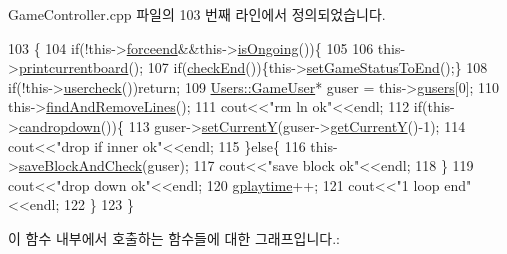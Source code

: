 Game\+Controller.\+cpp 파일의 103 번째 라인에서 정의되었습니다.


\begin{DoxyCode}
103                                       \{
104             \textcolor{keywordflow}{if}(!this->\hyperlink{class_tetris_1_1_game_controller_a015411333b232483387d89f3ba0617e0}{forceend}&&this->\hyperlink{class_tetris_1_1_game_controller_aecd04e471f7819a8b3f80e0dda748bdc}{isOngoing}())\{
105                 
106                 this->\hyperlink{class_tetris_1_1_game_controller_a5553ac767c6065148b7c332f59251e76}{printcurrentboard}();
107                 \textcolor{keywordflow}{if}(\hyperlink{class_tetris_1_1_game_controller_ac8058c827eaa393194dcfb83c6964f8a}{checkEnd}())\{this->\hyperlink{class_tetris_1_1_game_controller_a3c5e6034b2e2faf70371a13eb5f9c5bb}{setGameStatusToEnd}();\}
108                 \textcolor{keywordflow}{if}(!this->\hyperlink{class_tetris_1_1_game_controller_ab96e22daad51119b35cbee8cfb7385ef}{usercheck}())\textcolor{keywordflow}{return};
109                 \hyperlink{class_tetris_1_1_users_1_1_game_user}{Users::GameUser}* guser = this->\hyperlink{class_tetris_1_1_game_controller_a1a31d3a933daad6d95e20458eea2900e}{gusers}[0];
110                 this->\hyperlink{class_tetris_1_1_game_controller_ab19e8563acc9e724e130de60f87600b7}{findAndRemoveLines}();
111                 cout<<\textcolor{stringliteral}{"rm ln ok"}<<endl;
112                 \textcolor{keywordflow}{if}(this->\hyperlink{class_tetris_1_1_game_controller_ac4993d5ad8640ac617fec341fdb301ee}{candropdown}())\{
113                     guser->\hyperlink{class_tetris_1_1_users_1_1_game_user_aeedbe521004c22018b73a509e99f7d81}{setCurrentY}(guser->\hyperlink{class_tetris_1_1_users_1_1_game_user_af5bd7ff0b575af1b42b093488cff97e2}{getCurrentY}()-1);
114                     cout<<\textcolor{stringliteral}{"drop if inner ok"}<<endl;
115                 \}\textcolor{keywordflow}{else}\{
116                     this->\hyperlink{class_tetris_1_1_game_controller_a3c63a9754e4cbeae4f66a5760bb4055d}{saveBlockAndCheck}(guser);
117                     cout<<\textcolor{stringliteral}{"save block ok"}<<endl;
118                 \}
119                 cout<<\textcolor{stringliteral}{"drop down ok"}<<endl;
120                 \hyperlink{class_tetris_1_1_game_controller_a562adcade20e362160535cd7248a2cce}{gplaytime}++;
121                 cout<<\textcolor{stringliteral}{"1 loop end"}<<endl;
122             \}
123         \}
\end{DoxyCode}
이 함수 내부에서 호출하는 함수들에 대한 그래프입니다.\+:
\nopagebreak
